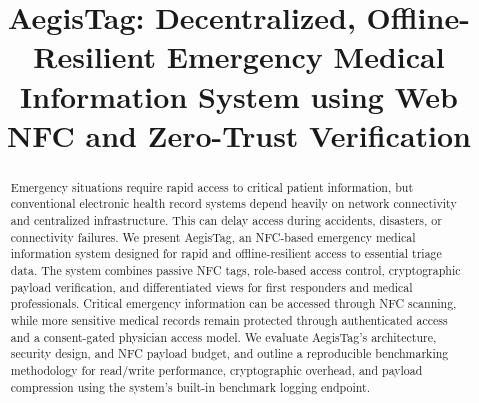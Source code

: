 \documentclass[conference]{IEEEtran}
\begin{document}
\title{AegisTag: Decentralized, Offline-Resilient Emergency Medical Information System using Web NFC and Zero-Trust Verification}

\author{
\and
{}
\and
{}
\and
{}
\and
{}
}

\maketitle

\begin{abstract}
Emergency situations require rapid access to critical patient information, but conventional electronic health record systems depend heavily on network connectivity and centralized infrastructure. This can delay access during accidents, disasters, or connectivity failures. We present AegisTag, an NFC-based emergency medical information system designed for rapid and offline-resilient access to essential triage data. The system combines passive NFC tags, role-based access control, cryptographic payload verification, and differentiated views for first responders and medical professionals. Critical emergency information can be accessed through NFC scanning, while more sensitive medical records remain protected through authenticated access and a consent-gated physician access model. We evaluate AegisTag's architecture, security design, and NFC payload budget, and outline a reproducible benchmarking methodology for read/write performance, cryptographic overhead, and payload compression using the system's built-in benchmark logging endpoint.
\end{abstract}
\end{document}
